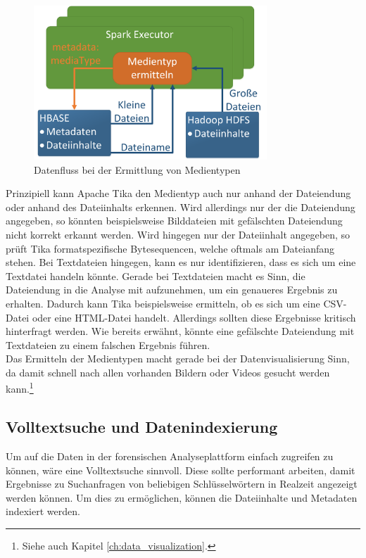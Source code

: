 \begin{figure}[ht]
  \centering
  \includegraphics[width=0.78\textwidth]{./resource/spark_processing_media_types.png}
  \caption{Datenfluss bei der Ermittlung von Medientypen}
  \label{fig:data_processing_media_types}
\end{figure}

\noindent
Prinzipiell kann Apache Tika den Medientyp auch nur anhand der Dateiendung oder anhand des Dateiinhalts erkennen. Wird allerdings nur der die Dateiendung angegeben, so könnten beispielsweise Bilddateien mit gefälschten Dateiendung nicht korrekt erkannt werden. Wird hingegen nur der Dateiinhalt angegeben, so prüft Tika formatspezifische Bytesequencen, welche oftmals am Dateianfang stehen. Bei Textdateien hingegen, kann es nur identifizieren, dass es sich um eine Textdatei handeln könnte. Gerade bei Textdateien macht es Sinn, die Dateiendung in die Analyse mit aufzunehmen, um ein genaueres Ergebnis zu erhalten. Dadurch kann Tika beispielsweise ermitteln, ob es sich um eine CSV-Datei oder eine HTML-Datei handelt. Allerdings sollten diese Ergebnisse kritisch hinterfragt werden. Wie bereits erwähnt, könnte eine gefälschte Dateiendung mit Textdateien zu einem falschen Ergebnis führen.\\

\noindent
Das Ermitteln der Medientypen macht gerade bei der Datenvisualisierung Sinn, da damit schnell nach allen vorhanden Bildern oder Videos gesucht werden kann.\footnote{Siehe auch Kapitel \ref{ch:data_visualization}.}

\subsection{Volltextsuche und Datenindexierung}
\label{subsec:file_indexing}
Um auf die Daten in der forensischen Analyseplattform einfach zugreifen zu können, wäre eine Volltextsuche sinnvoll. Diese sollte performant arbeiten, damit Ergebnisse zu Suchanfragen von beliebigen Schlüsselwörtern in Realzeit angezeigt werden können. Um dies zu ermöglichen, können die Dateiinhalte und Metadaten indexiert werden.\\

